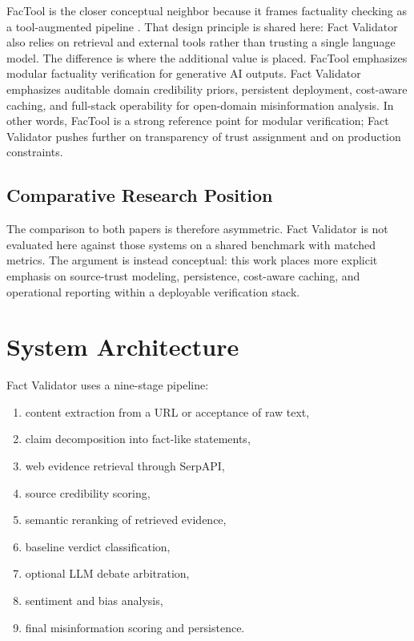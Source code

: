\documentclass[conference]{IEEEtran}
\begin{document}
FacTool is the closer conceptual neighbor because it frames factuality checking as a tool-augmented pipeline \cite{grave2023factool}. That design principle is shared here: Fact Validator also relies on retrieval and external tools rather than trusting a single language model. The difference is where the additional value is placed. FacTool emphasizes modular factuality verification for generative AI outputs. Fact Validator emphasizes auditable domain credibility priors, persistent deployment, cost-aware caching, and full-stack operability for open-domain misinformation analysis. In other words, FacTool is a strong reference point for modular verification; Fact Validator pushes further on transparency of trust assignment and on production constraints.

\subsection{Comparative Research Position}

The comparison to both papers is therefore asymmetric. Fact Validator is not evaluated here against those systems on a shared benchmark with matched metrics. The argument is instead conceptual: this work places more explicit emphasis on source-trust modeling, persistence, cost-aware caching, and operational reporting within a deployable verification stack.

\section{System Architecture}

Fact Validator uses a nine-stage pipeline:

\begin{enumerate}
  \item content extraction from a URL or acceptance of raw text,
  \item claim decomposition into fact-like statements,
  \item web evidence retrieval through SerpAPI,
  \item source credibility scoring,
  \item semantic reranking of retrieved evidence,
  \item baseline verdict classification,
  \item optional LLM debate arbitration,
  \item sentiment and bias analysis,
  \item final misinformation scoring and persistence.
\end{enumerate}
\end{document}
